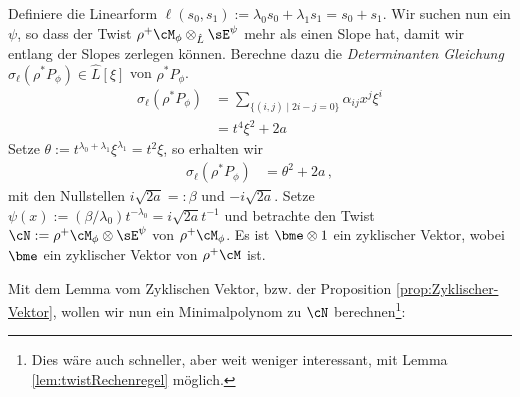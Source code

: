 Definiere die Linearform $\ell(s_0,s_1):=\lambda_0s_0+\lambda_1s_1=s_0+s_1$.
Wir suchen nun ein $\psi$, so dass der Twist $\rho^+\cM_{\phi}\otimes_{\hat
L}\sE^\psi$ mehr als einen Slope hat, damit wir entlang der Slopes zerlegen
können.  Berechne dazu die \emph{Determinanten Gleichung}
$\sigma_\ell(\rho^*P_{\phi})\in \hat L[\xi]$ von $\rho^*P_{\phi}$.
\begin{align*}
\sigma_\ell(\rho^*P_{\phi})
  &= \sum_{\{(i,j)\mid 2i-j=0\}}\alpha_{ij}x^{j}\xi^i\\
  &= t^4\xi^2 + 2a
\end{align*}
Setze $\theta:=t^{\lambda_0+\lambda_1}\xi^{\lambda_1}=t^2\xi$, so erhalten wir
\begin{align*}
\sigma_\ell(\rho^*P_{\phi}) &= \theta^2 + 2a \,,
\end{align*}
mit den Nullstellen $i\sqrt{2a}=:\beta$ und $-i\sqrt{2a}$.
Setze $\psi(x):=(\beta/\lambda_0)t^{-\lambda_0}=i\sqrt{2a}t^{-1}$ und
betrachte den Twist $\cN:=\rho^+\cM_{\phi}\otimes\sE^\psi$ von
$\rho^+\cM_{\phi}$.
Es ist $\bme\otimes 1$ ein zyklischer Vektor, wobei $\bme$ ein zyklischer
Vektor von $\rho^+\cM$ ist.
\iffalse
  Somit existieren $a_0(t)$ und $a_1(t)$ in $\hat L$, so dass
  \[
  0=\partial_t^2 (\bme\otimes 1) + (a_1(t)\partial_t + a_0(t)) \bme\otimes 1
  \]
  und damit ist dann $\cN=\cD/\cD\cdot(\partial_t^2+a_1(t)\partial_t+a_0(t))$.
\fi
Mit dem Lemma vom Zyklischen Vektor, bzw. der Proposition
\ref{prop:Zyklischer-Vektor}, wollen wir nun ein Minimalpolynom zu $\cN$
berechnen\footnote{
Dies wäre auch schneller, aber weit weniger interessant, mit Lemma
\ref{lem:twistRechenregel} möglich.
}:

